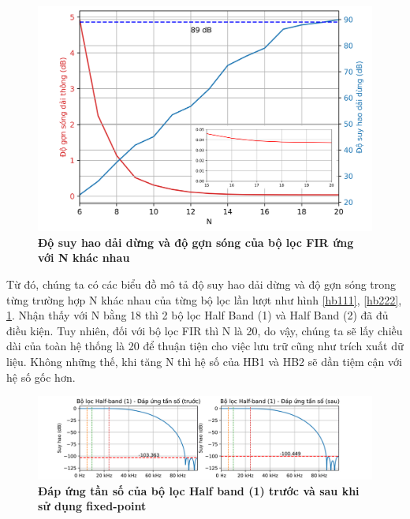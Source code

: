 \begin{figure}[H]
    \centering
    \includegraphics[width=11.5cm]{Images/Chuong4/plot/fir.png}
    \caption[Độ suy hao dải dừng và độ gợn sóng của bộ lọc FIR ứng với N khác nhau]{\bfseries \fontsize{12pt}{0pt}\selectfont Độ suy hao dải dừng và độ gợn sóng của bộ lọc FIR ứng với N khác nhau}
    \label{firrr}
\end{figure}
Từ đó, chúng ta có các biểu đồ mô tả độ suy hao dải dừng và độ gợn sóng trong từng trường hợp N khác nhau của từng bộ lọc lần lượt như hình \ref{hb111}, \ref{hb222}, \ref{firrr}. Nhận thấy với N bằng 18 thì 2 bộ lọc Half Band (1) và Half Band (2) đã đủ điều kiện. Tuy nhiên, đối với bộ lọc FIR thì N là 20, do vậy, chúng ta sẽ lấy chiều dài của toàn hệ thống là 20 để thuận tiện cho việc lưu trữ cũng như trích xuất dữ liệu. Không những thế, khi tăng N thì hệ số của HB1 và HB2 sẽ dần tiệm cận với hệ số gốc hơn.
\begin{figure}[H]
    \centering
    \includegraphics[width=17.5cm]{Images/Chuong4/hb1.png}
    \caption[Đáp ứng tần số của bộ lọc Half band (1) trước và sau khi sử dụng fixed-point]{\bfseries \fontsize{12pt}{0pt}\selectfont Đáp ứng tần số của bộ lọc Half band (1) trước và sau khi sử dụng fixed-point}
    \label{hb1_d}
\end{figure}

